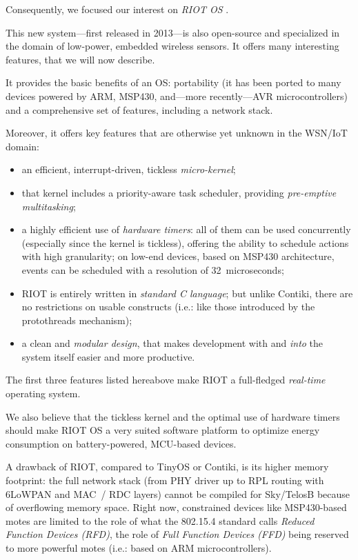\documentclass[a4paper,twoside]{article}
\begin{document}
Consequently, we focused our interest on \emph{RIOT OS} \cite{RIOT}.

This new system---first released in 2013---is also open-source and
specialized in the domain of low-power, embedded wireless sensors.
It offers many interesting features, that we will now describe.

It provides the basic benefits of an OS: portability (it has been ported
to many devices powered by ARM, MSP430, and---more recently---AVR
microcontrollers) and a comprehensive set of features, including
a network stack.

Moreover, it offers key features that are otherwise yet unknown in
the WSN/IoT domain:

\begin{itemize}

\item an efficient, interrupt-driven, tickless \emph{micro-kernel};

\item that kernel includes a priority-aware task scheduler, providing
      \emph{pre-emptive multitasking};

\item a highly efficient use of \emph{hardware timers}: all of them can be
      used concurrently (especially since the kernel is tickless), offering
      the ability to schedule actions with high granularity; on low-end
      devices, based on MSP430 architecture, events can be scheduled
      with a resolution of 32~microseconds;

\item RIOT is entirely written in \emph{standard C language}; but unlike
      Contiki, there are no restrictions on usable constructs (i.e.: like
      those introduced by the protothreads mechanism);

\item a clean and \emph{modular design}, that makes development with and
      \emph{into} the system itself easier and more productive.

\end{itemize}

The first three features listed hereabove make RIOT a full-fledged
\emph{real-time} operating system.

We also believe that the tickless kernel and the optimal use of hardware
timers should make RIOT OS a very suited software platform to optimize energy
consumption on battery-powered, MCU-based devices.

A drawback of RIOT, compared to TinyOS or Contiki, is its higher memory
footprint: the full network stack (from PHY driver up to RPL routing with
\mbox{6LoWPAN} and MAC~/ RDC layers) cannot be compiled for Sky/TelosB
because of overflowing memory space. Right now, constrained devices like
MSP430-based motes are limited to the role of what the 802.15.4 standard
calls \emph{Reduced Function Devices (RFD)}, the role of \emph{Full
Function Devices (FFD)} being reserved to more powerful motes (i.e.:
based on ARM microcontrollers).
\end{document}
